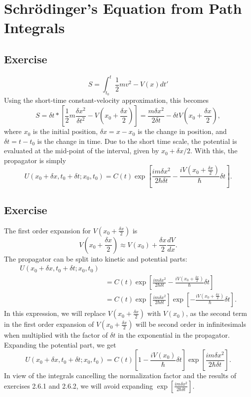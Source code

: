 \section{Schrödinger's Equation from Path Integrals}
\subsection{Exercise}
\begin{equation}
    S=\int_{t_0}^{t}\frac 1 2 m v^2 -V(x)dt'
\end{equation}
Using the short-time constant-velocity approximation, this becomes
\begin{equation}
    S=\delta t*[\frac 1 2 m \frac {\delta x^2}{\delta t^2}-V(x_0+\frac {\delta x} 2)]=\frac{m\delta x^2}{2\delta t}-\delta tV(x_0+\frac{\delta x}2),
\end{equation}
where $x_0$ is the initial position, $\delta x= x-x_0$ is the change in position, and $\delta t=t-t_0$ is the change in time. Due to the short time scale, the potential is evaluated at the mid-point of the interval, given by $x_0+\delta x/2$.
With this, the propagator is simply 
\begin{equation}
    U(x_0+\delta x,t_0+\delta t;x_0,t_0)=C(t)\exp[\frac{im\delta x^2}{2\hbar \delta t}-\frac{iV(x_0+\frac {\delta x} 2)}\hbar\delta t].
\end{equation}
\subsection{Exercise}
The first order expansion for $V(x_0+\frac{\delta x}2)$ is 
\begin{equation}
    V(x_0+\frac{\delta x}2)\approx V(x_0)+\frac{\delta x}2 \frac{dV}{dx}.
\end{equation}
The propagator can be split into kinetic and potential parts:
\begin{align}
      U(x_0+\delta x,t_0+\delta t;x_0,t_0)\\&=C(t)\exp[\frac{im\delta x^2}{2\hbar \delta t}-\frac{iV(x_0+\frac {\delta x} 2)}\hbar\delta t]
      \\&=C(t)\exp[\frac{im\delta x^2}{2\hbar \delta t}]\exp[-\frac{iV(x_0+\frac {\delta x} 2)}\hbar\delta t].
\end{align}
In this expression, we will replace $V(x_0+\frac{\delta x}2)$ with $V(x_0)$, as the second term in the first order expansion of $V(x_0+\frac{\delta x}2)$ will be second order in infinitesimals when multiplied with the factor of $\delta t$ in the exponential in the propagator. Expanding the potential part, we get
\begin{equation}
     U(x_0+\delta x,t_0+\delta t;x_0,t_0)=C(t)[1-\frac{iV(x_0)}\hbar\delta t]\exp[\frac{im\delta x^2}{2\hbar \delta t}].
\end{equation}
In view of the integrals cancelling the normalization factor and the results of exercises 2.6.1 and 2.6.2, we will avoid expanding $\exp[\frac{im\delta x^2}{2\hbar \delta t}]$.
